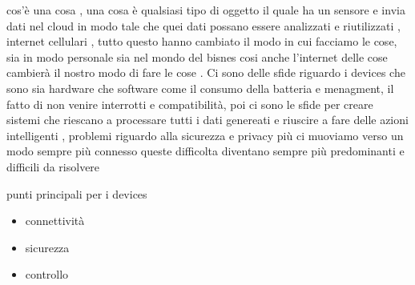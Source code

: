 cos'è una cosa , una cosa è qualsiasi tipo di oggetto il quale ha un sensore e
invia dati nel cloud in modo tale che quei dati possano essere analizzati e
riutilizzati , internet cellulari , tutto questo hanno cambiato il modo in cui
facciamo le cose, sia in modo personale sia nel mondo del bisnes  cosi anche
l'internet delle cose cambierà il nostro modo di fare le cose . Ci sono delle
sfide riguardo i devices che sono sia hardware che software come il consumo
della batteria e menagment, il fatto di non venire interrotti e compatibilità,
poi ci sono le sfide per creare sistemi che riescano a processare tutti i dati
genereati e riuscire a fare delle azioni intelligenti , problemi riguardo alla
sicurezza e privacy più ci muoviamo verso un modo sempre più connesso queste
difficolta diventano sempre più predominanti e difficili da risolvere

punti principali per i devices
\begin{itemize}
\item connettività
\item sicurezza
\item controllo
\end{itemize}
